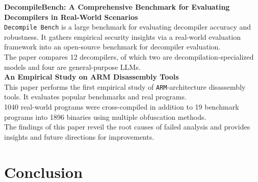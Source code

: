 \documentclass[seminar]{plai}
\begin{document}
\noindent\textbf{DecompileBench: A Comprehensive Benchmark for Evaluating Decompilers in Real-World Scenarios}\\
\texttt{Decompile Bench} is a large benchmark for evaluating decompiler accuracy and robustness. It gathers empirical security insights via a real-world evaluation framework into an open-source benchmark for decompiler evaluation.\\
The paper compares 12 decompilers, of which two are decompilation-specialized models and four are general-purpose LLMs.\cite{decompileBench-comprehensice-benchmark-for-evaluating-decompilers-in-real-world-scenarios}\\

\noindent\textbf{An Empirical Study on ARM Disassembly Tools}\\
This paper performs the first empirical study of \texttt{ARM}-architecture disassembly tools. It evaluates popular benchmarks and real programs.\\
1040 real-world programs were cross-compiled in addition to 19 benchmark programs into 1896 binaries using multiple obfuscation methods.\\
The findings of this paper reveil the root causes of failed analysis and provides insights and future directions for improvements.\cite{an-empirical-study-on-ARM-disassembly-disassembly-tools} 

\section{Conclusion}
\label{sec:conclusion}




\end{document}
